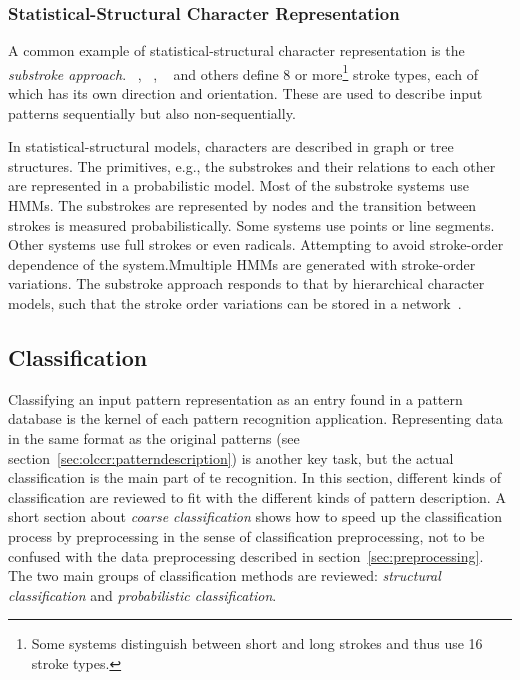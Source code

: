\subsubsection{Statistical-Structural Character Representation}
\label{sec:olccr:statistical-structuralcharacterrepresentation}

A common example of statistical-structural character representation is the 
\emph{substroke approach}. ~\citeyear{Nakai2001}, 
~\citeyear{Shimodaira2003},
~\citeyear{Okumura2005} and others define 8 or more\footnote{Some systems 
distinguish between short and long strokes and thus use 16 stroke types.} stroke 
types, each of which has its own direction and orientation. These are used to
describe input patterns sequentially but also non-sequentially.

In statistical-structural models, characters are described in graph or tree 
structures. The primitives, e.g., the substrokes and their relations to each other
are represented in a probabilistic model. 
Most of the substroke systems use HMMs. The substrokes are represented by nodes
and the transition between strokes is measured probabilistically. Some systems
use points or line segments. Other systems use full strokes or even radicals.
Attempting to avoid stroke-order dependence of the system.Mmultiple HMMs
are generated with stroke-order variations.
The substroke approach responds to that by hierarchical character models,
such that the stroke order variations can be stored in a 
network~.  

\subsection{Classification}
\label{sec:olccr:classification}


Classifying an input pattern representation as an entry found in a pattern 
database is the kernel of each pattern recognition application.
Representing data in the same format as the original patterns 
(see section~\ref{sec:olccr:patterndescription}) is another key task, but 
the actual classification is the main part of te recognition.
In this section, different kinds of classification are reviewed to fit with
the different kinds of pattern description. 
A short section about \emph{coarse classification} shows how to
speed up the classification process by preprocessing in the sense of 
classification preprocessing, not to be confused with the data preprocessing
described in section~\ref{sec:preprocessing}.
The two main groups of 
classification methods are reviewed: \emph{structural classification} and 
\emph{probabilistic classification}.

